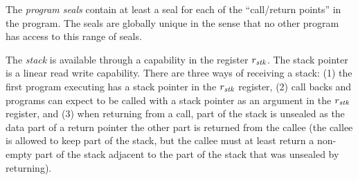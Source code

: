 \documentclass[a4paper]{article}
\begin{document}
The \emph{program seals} contain at least a seal for each of the ``call/return points'' in the program. The seals are globally unique in the sense that no other program has access to this range of seals.

The \emph{stack} is available through a capability in the register $r_{\mathit{stk}}$. The stack pointer is a linear read write capability. There are three ways of receiving a stack: (1) the first program executing has a stack pointer in the $r_{\mathit{stk}}$ register, (2) call backs and programs can expect to be called with a stack pointer as an argument in the $r_{\mathit{stk}}$ register, and (3) when returning from a call, part of the stack is unsealed as the data part of a return pointer the other part is returned from the callee (the callee is allowed to keep part of the stack, but the callee must at least return a non-empty part of the stack adjacent to the part of the stack that was unsealed by returning).
\end{document}
